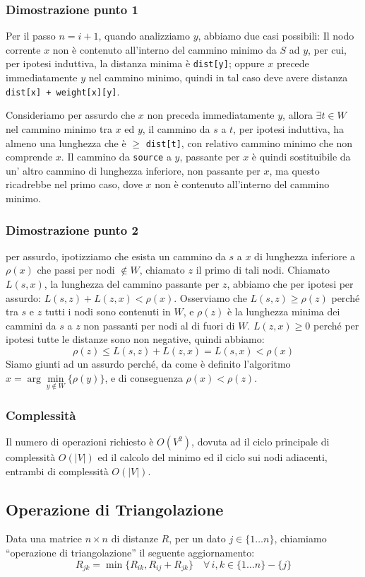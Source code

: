 \documentclass[../template]{subfiles}
\begin{document}
\subsubsection{Dimostrazione punto 1}
Per il passo $n = i+1$, quando analizziamo $y$, abbiamo due casi possibili:
Il nodo corrente $x$ non è contenuto all'interno del cammino minimo da $S$ ad $y$, per cui, per ipotesi induttiva, la distanza minima è \lstinline{dist[y]};
oppure $x$ precede immediatamente $y$ nel cammino minimo, quindi in tal caso deve avere distanza \lstinline{dist[x] + weight[x][y]}.

Consideriamo per assurdo che $x$ non preceda immediatamente $y$, allora $\exists t \in W$ nel cammino minimo tra $x$ ed $y$,
il cammino da $s$ a $t$, per ipotesi induttiva, ha almeno una lunghezza che è $\ge$ \lstinline{dist[t]}, con relativo cammino minimo
che non comprende $x$.
Il cammino da \lstinline{source} a $y$, passante per $x$ è quindi sostituibile da un' altro cammino di lunghezza inferiore, non passante
per $x$, ma questo ricadrebbe nel primo caso, dove $x$ non è contenuto all'interno del cammino minimo.

\subsubsection{Dimostrazione punto 2}
per assurdo, ipotizziamo che esista un cammino da $s$ a $x$ di lunghezza inferiore a $\rho(x)$ che passi per nodi $\notin W$, chiamato $z$
il primo di tali nodi.
Chiamato $L(s, x)$, la lunghezza del cammino passante per $z$, abbiamo che per ipotesi per assurdo: $L(s, z) + L(z, x) < \rho(x)$.
Osserviamo che $L(s, z) \ge \rho(z)$ perché tra $s$ e $z$ tutti i nodi sono contenuti in $W$, e $\rho(z)$ è la lunghezza minima
dei cammini da $s$ a $z$ non passanti per nodi al di fuori di $W$.
$L(z, x) \ge 0$ perché per ipotesi tutte le distanze sono non negative, quindi abbiamo:
\[
    \rho(z) \le L(s, z) + L(z, x) = L(s, x) < \rho(x)
\]
Siamo giunti ad un assurdo perché, da come è definito l'algoritmo $x = \arg\min\limits_{y\notin W}\{\rho(y)\}$, e di
conseguenza $\rho(x) < \rho(z)$.
\subsubsection{Complessità}
Il numero di operazioni richiesto è $O(V^2)$, dovuta ad il ciclo principale di complessità $O(|V|)$ ed il
calcolo del minimo ed il ciclo sui nodi adiacenti, entrambi di complessità $O(|V|)$.

\newpage
\subsection{Operazione di Triangolazione}
Data una matrice $n \times n$ di distanze $R$, per un dato $j \in \{1\ldots n\}$, chiamiamo ``operazione di triangolazione'' il
seguente aggiornamento:
\[
    R_{jk} = \min\big\{R_{ik}, R_{ij} + R_{jk}\big\} \quad \forall\,i, k \in \big\{1\ldots n\big\} - \big\{j\big\}
\]
\end{document}
